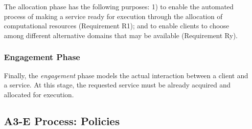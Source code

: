 The allocation phase has the following purposes: 1) to enable the automated process of making a service ready for execution through the allocation of computational resources (Requirement R1); and to enable clients to choose among different alternative domains that may be available (Requirement Ry).
 



\subsubsection*{Engagement Phase}\label{sec:A3-E-engagement}

Finally, the \textit{engagement} phase models the actual interaction between a client and a service. At this stage, the requested service must be already acquired and allocated for execution. 

\subsection{A3-E Process: Policies}

